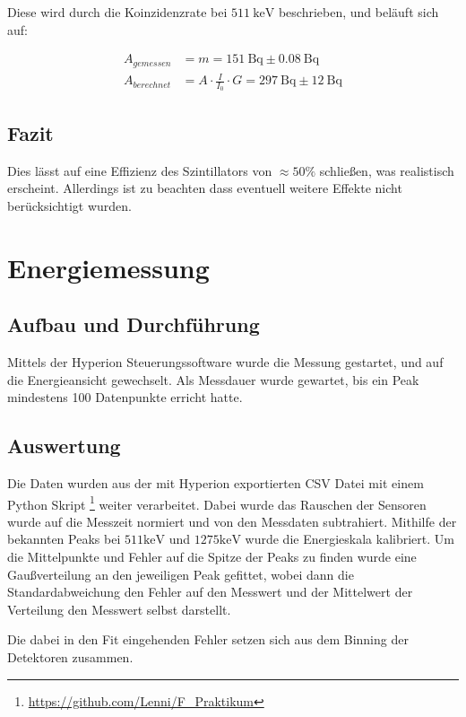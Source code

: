 \documentclass[12pt,twoside,a4paper]{scrartcl}
\begin{document}
			Diese wird durch die Koinzidenzrate bei $\SI{511}{\kilo \electronvolt}$ beschrieben, und beläuft sich auf:

			\begin{align*}
				A_{gemessen} &= m = \SI{151}{\becquerel} \pm \SI{0.08}{\becquerel} \\
				A_{berechnet} &= A \cdot \frac{I}{I_0} \cdot G = \SI{297}{\becquerel} \pm \SI{12}{\becquerel}
			\end{align*}

		\subsection{Fazit}

			Dies lässt auf eine Effizienz des Szintillators von $ \approx 50 \%$ schließen, was realistisch erscheint. Allerdings ist zu beachten dass eventuell weitere Effekte nicht berücksichtigt wurden.

	\section{Energiemessung}

	\subsection{Aufbau und Durchführung}
		Mittels der Hyperion Steuerungssoftware wurde die Messung gestartet, und auf die Energieansicht gewechselt. Als Messdauer wurde gewartet, bis ein Peak mindestens 100 Datenpunkte erricht hatte.


	\subsection{Auswertung}

		Die Daten wurden aus der mit Hyperion exportierten CSV Datei mit einem Python Skript \footnote{\url{https://github.com/Lenni/F_Praktikum}} weiter verarbeitet. Dabei wurde das Rauschen der Sensoren wurde auf die Messzeit normiert und von den Messdaten subtrahiert. Mithilfe der bekannten Peaks bei $511 \si{\kilo \electronvolt}$ und $1275 \si{\kilo \electronvolt}$ wurde die Energieskala kalibriert. Um die Mittelpunkte und Fehler auf die Spitze der Peaks zu finden wurde eine Gaußverteilung an den jeweiligen Peak gefittet, wobei dann die Standardabweichung den Fehler auf den Messwert und der Mittelwert der Verteilung den Messwert selbst darstellt.

		Die dabei in den Fit eingehenden Fehler setzen sich aus dem Binning der Detektoren zusammen.
\end{document}
